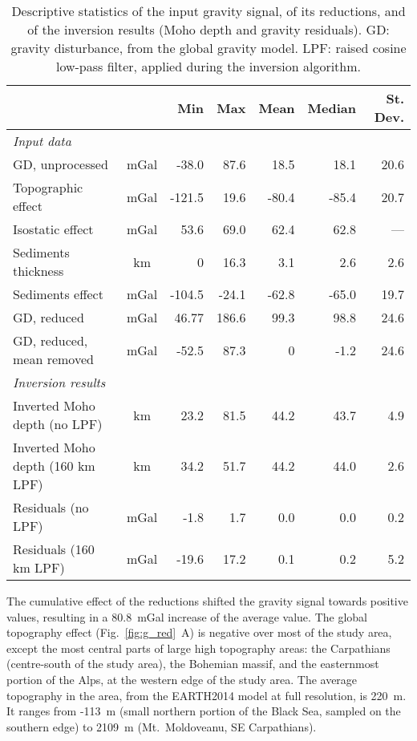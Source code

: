 \begin{table}
    \caption[Descriptive statistics of the input gravity signal, of its reductions, and of the inversion results.]{Descriptive statistics of the input gravity signal, of its reductions, and of the inversion results (Moho depth and gravity residuals). GD: gravity disturbance, from the global gravity model. LPF: raised cosine low-pass filter, applied during the inversion algorithm.}
    \begin{adjustbox}{center}
    \begingroup\setlength{\fboxsep}{0pt}
    \colorbox{tablebackground}{%
	\begin{tabular}{lcrrrrr}
		\toprule
		 & & \textbf{Min} & \textbf{Max} & \textbf{Mean} & \textbf{Median} & \textbf{St. Dev.} \\
		 \midrule
		\textit{Input data} \\
		\quad GD, unprocessed & mGal & -38.0 & 87.6 & 18.5 & 18.1 & 20.6 \\
		\quad Topographic effect & mGal & -121.5 & 19.6 & -80.4 & -85.4 & 20.7 \\
		\quad Isostatic effect & mGal & 53.6 & 69.0 & 62.4 & 62.8 & --- \\
		\quad Sediments thickness & km & 0 & 16.3 & 3.1 & 2.6 & 2.6 \\
		\quad Sediments effect & mGal & -104.5 & -24.1 & -62.8 & -65.0 & 19.7 \\
		\quad GD, reduced & mGal & 46.77 & 186.6 & 99.3 & 98.8 & 24.6 \\
		\quad GD, reduced, mean removed & mGal & -52.5 & 87.3 & 0 & -1.2 & 24.6 \\
		\textit{Inversion results} \\
		\quad Inverted Moho depth (no LPF) & km & 23.2 & 81.5 & 44.2 & 43.7 & 4.9 \\
		\quad Inverted Moho depth (160 km LPF) & km & 34.2 & 51.7 & 44.2 & 44.0 & 2.6 \\
		\quad Residuals (no LPF) & mGal & -1.8 & 1.7 & 0.0 & 0.0 & 0.2 \\
		\quad Residuals (160 km LPF) & mGal & -19.6 & 17.2 & 0.1 & 0.2 & 5.2 \\
		\bottomrule
    \end{tabular}
    }\endgroup
    \end{adjustbox}
	\label{tab:GravDescrStats}
\end{table}

The cumulative effect of the reductions shifted the gravity signal towards positive values, resulting in a 80.8~mGal increase of the average value.
The global topography effect (Fig.~\ref{fig:g_red}~A) is negative over most of the study area, except the most central parts of large high topography areas: the Carpathians (centre-south of the study area), the Bohemian massif, and the easternmost portion of the Alps, at the western edge of the study area.
The average topography in the area, from the {EARTH2014} model at full resolution, is 220~m.
It ranges from -113~m (small northern portion of the Black Sea, sampled on the southern edge) to 2109~m (Mt.~Moldoveanu, SE Carpathians).

